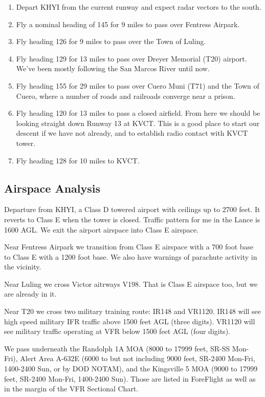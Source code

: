 \begin{enumerate}
    \item Depart KHYI from the current runway and expect radar vectors to the south.
    \item Fly a nominal heading of 145 for 9 miles to pass over Fentress Airpark.
    \item Fly heading 126 for 9 miles to pass over the Town of Luling.
    \item Fly heading 129 for 13 miles to pass over Dreyer Memorial (T20) airport. We've been mostly following the San Marcos River until now.
    \item Fly heading 155 for 29 miles to pass over Cuero Muni (T71) and the Town of Cuero, where a number of roads and railroads converge near a prison.
    \item Fly heading 120 for 13 miles to pass a closed airfield. From here we should be looking straight down Runway 13 at KVCT. This is a good place to start our descent if we have not already, and to establish radio contact with KVCT tower.
    \item Fly heading 128 for 10 miles to KVCT.
\end{enumerate}

\subsection{Airspace Analysis}

Departure from KHYI, a Class D towered airport with ceilings up to 2700 feet. It reverts to Class E when the tower is closed. Traffic pattern for me in the Lance is 1600 AGL. We exit the airport airspace into Class E airspace.

Near Fentress Airpark we transition from Class E airspace with a 700 foot base to Class E with a 1200 foot base. We also have warnings of parachute activity in the vicinity.

Near Luling we cross Victor aitrways V198. That is Class E airspace too, but we are already in it.

Near T20 we cross two military training route: IR148 and VR1120. IR148 will see high speed military IFR traffic above 1500 feet AGL (three digits). VR1120 will see military traffic operating at VFR below 1500 feet AGL (four digits).

We pass underneath the Randolph 1A MOA (8000 to 17999 feet, SR-SS Mon-Fri), Alert Area A-632E (6000 to but not including 9000 feet, SR-2400 Mon-Fri, 1400-2400 Sun, or by DOD NOTAM), and the Kingsville 5 MOA (9000 to 17999 feet, SR-2400 Mon-Fri, 1400-2400 Sun). Those are listed in ForeFlight as well as in the margin of the VFR Sectional Chart.

